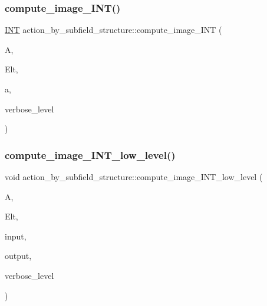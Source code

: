 \subsubsection{\texorpdfstring{compute\+\_\+image\+\_\+\+I\+N\+T()}{compute\_image\_INT()}}
{\footnotesize\ttfamily \mbox{\hyperlink{galois_8h_a09fddde158a3a20bd2dcadb609de11dc}{I\+NT}} action\+\_\+by\+\_\+subfield\+\_\+structure\+::compute\+\_\+image\+\_\+\+I\+NT (\begin{DoxyParamCaption}\item[{\mbox{\hyperlink{classaction}{action}} \&}]{A,  }\item[{\mbox{\hyperlink{galois_8h_a09fddde158a3a20bd2dcadb609de11dc}{I\+NT}} $\ast$}]{Elt,  }\item[{\mbox{\hyperlink{galois_8h_a09fddde158a3a20bd2dcadb609de11dc}{I\+NT}}}]{a,  }\item[{\mbox{\hyperlink{galois_8h_a09fddde158a3a20bd2dcadb609de11dc}{I\+NT}}}]{verbose\+\_\+level }\end{DoxyParamCaption})}

\mbox{\label{classaction__by__subfield__structure_a34809d4759ad884c47080ec3beed5929}} 
\subsubsection{\texorpdfstring{compute\+\_\+image\+\_\+\+I\+N\+T\+\_\+low\+\_\+level()}{compute\_image\_INT\_low\_level()}}
{\footnotesize\ttfamily void action\+\_\+by\+\_\+subfield\+\_\+structure\+::compute\+\_\+image\+\_\+\+I\+N\+T\+\_\+low\+\_\+level (\begin{DoxyParamCaption}\item[{\mbox{\hyperlink{classaction}{action}} \&}]{A,  }\item[{\mbox{\hyperlink{galois_8h_a09fddde158a3a20bd2dcadb609de11dc}{I\+NT}} $\ast$}]{Elt,  }\item[{\mbox{\hyperlink{galois_8h_a09fddde158a3a20bd2dcadb609de11dc}{I\+NT}} $\ast$}]{input,  }\item[{\mbox{\hyperlink{galois_8h_a09fddde158a3a20bd2dcadb609de11dc}{I\+NT}} $\ast$}]{output,  }\item[{\mbox{\hyperlink{galois_8h_a09fddde158a3a20bd2dcadb609de11dc}{I\+NT}}}]{verbose\+\_\+level }\end{DoxyParamCaption})}

